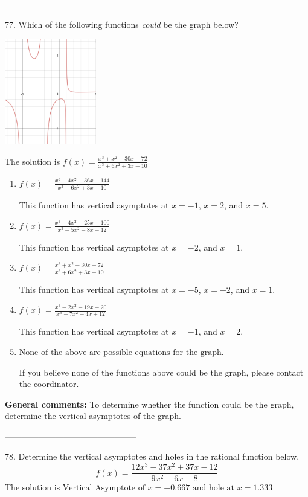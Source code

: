 \documentclass{extbook}[14pt]
\begin{document}
-----------------------------------------------

77. Which of the following functions \textit{could} be the graph below?
\begin{center} \includegraphics[width=0.3\textwidth]{../Figures/identifyGraphOfRationalFunctionC.png} \end{center} 

The solution is $ f(x) = \frac{x^{3} + x^{2} -30 x -72}{x^{3} +6 x^{2} +3 x -10} $ 

\begin{enumerate}[label=\Alph*.] 
\item $ f(x) = \frac{x^{3} -4 x^{2} -36 x + 144}{x^{3} -6 x^{2} +3 x + 10} $ 

 This function has vertical asymptotes at $x=-1$, $x=2$, and $x=5$. 
\item $ f(x) = \frac{x^{3} -4 x^{2} -25 x + 100}{x^{3} -5 x^{2} -8 x + 12} $ 

 This function has vertical asymptotes at $x=-2$, and $x=1$. 
\item $ f(x) = \frac{x^{3} + x^{2} -30 x -72}{x^{3} +6 x^{2} +3 x -10} $ 

 This function has vertical asymptotes at $x=-5$, $x=-2$, and $x=1$. 
\item $ f(x) = \frac{x^{3} -2 x^{2} -19 x + 20}{x^{3} -7 x^{2} +4 x + 12} $ 

 This function has vertical asymptotes at $x=-1$, and $x=2$. 
\item $ \text{None of the above are possible equations for the graph.} $ 

 If you believe none of the functions above could be the graph, please contact the coordinator. 
\end{enumerate} 
 
\textbf{General comments:} To determine whether the function could be the graph, determine the vertical asymptotes of the graph.

-----------------------------------------------

78. Determine the vertical asymptotes and holes in the rational function below.
\[ f(x) = \frac{12x^{3} -37 x^{2} +37 x -12}{9x^{2} -6 x -8} \] 
The solution is $ \text{Vertical Asymptote of } x = -0.667 \text{ and hole at } x = 1.333 $ 
\end{document}
